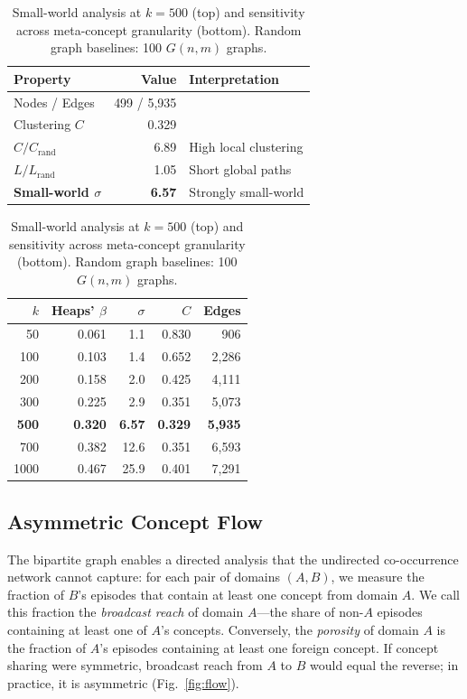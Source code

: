\documentclass{svproc}
\begin{document}
\begin{table}[!htb]
\centering
\caption{Small-world analysis at $k\!=\!500$ (top) and sensitivity across
meta-concept granularity (bottom). Random graph baselines: 100 $G(n,m)$ graphs.}
\label{tab:smallworld}
\begin{tabular}{lrl}
\toprule
Property & Value & Interpretation \\
\midrule
Nodes / Edges & 499 / 5,935 & \\
Clustering $C$ & 0.329 & \\
$C / C_\text{rand}$ & 6.89 & High local clustering \\
$L / L_\text{rand}$ & 1.05 & Short global paths \\
\textbf{Small-world $\sigma$} & \textbf{6.57} & Strongly small-world \\
\bottomrule
\end{tabular}
\vspace{4pt}
\label{tab:sensitivity}
\begin{tabular}{rrrrr}
\toprule
$k$ & Heaps' $\beta$ & $\sigma$ & $C$ & Edges \\
\midrule
50   & 0.061 &  1.1 & 0.830 &    906 \\
100  & 0.103 &  1.4 & 0.652 &  2,286 \\
200  & 0.158 &  2.0 & 0.425 &  4,111 \\
300  & 0.225 &  2.9 & 0.351 &  5,073 \\
\textbf{500} & \textbf{0.320} & \textbf{6.57} & \textbf{0.329} & \textbf{5,935} \\
700  & 0.382 & 12.6 & 0.351 &  6,593 \\
1000 & 0.467 & 25.9 & 0.401 &  7,291 \\
\bottomrule
\end{tabular}
\end{table}

\subsection{Asymmetric Concept Flow}

The bipartite graph enables a directed analysis that the undirected co-occurrence
network cannot capture: for each pair of domains $(A, B)$, we measure the fraction
of $B$'s episodes that contain at least one concept from domain $A$. We call this
fraction the \emph{broadcast reach} of domain $A$---the share of non-$A$ episodes
containing at least one of $A$'s concepts. Conversely, the \emph{porosity} of
domain $A$ is the fraction of $A$'s episodes containing at least one foreign
concept. If concept sharing were symmetric, broadcast reach from $A$ to $B$ would
equal the reverse; in practice, it is asymmetric (Fig.~\ref{fig:flow}).
\end{document}
